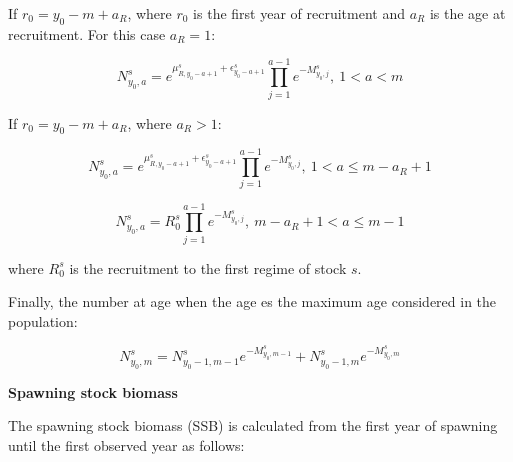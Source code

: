 \documentclass{article}
\begin{document}
If $r_0 = y_0-m+a_R$, where $r_0$ is the first year of recruitment and $a_R$ is the age at recruitment. For this case $a_R=1$:

\begin{equation}
N^s_{y_0,a}=e^{\mu_{R,y_0-a+1}^s + \epsilon^s_{y_0-a+1}}
            \prod_{j=1}^{a-1}e^{-M^s_{y_0,j}}, \ 1<a<m
\end{equation}

If $r_0 = y_0-m+a_R$, where $a_R>1$:

\begin{equation}
N^s_{y_0,a}=e^{\mu_{R,y_0-a+1}^s + \epsilon^s_{y_0-a+1}}                          \prod_{j=1}^{a-1}e^{-M^s_{y_0,j}}, \ 1<a\leq m-a_R+1
\end{equation}

\begin{equation}
N^s_{y_0,a}=R_0^s\prod_{j=1}^{a-1}e^{-M^s_{y_0,j}}, \ m-a_R+1<a\leq m-1
\end{equation}

where $R_0^s$ is the recruitment to the first regime of stock $s$.

Finally, the number at age when the age es the maximum age considered in the population:

\begin{equation}
N^s_{y_0,m}=N^s_{y_0-1,m-1}e^{-M^s_{y_0,m-1}}+N^s_{y_0-1,m}e^{-M^s_{y_0,m}}
\end{equation}





\newpage

\textbf{Spawning stock biomass}

The spawning stock biomass (SSB) is calculated from the first year of spawning until the first observed year as follows:
\end{document}
